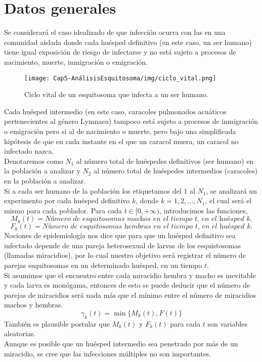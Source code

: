 \section{Datos generales}
    \label{datos-generales} 
    Se considerará el caso idealizado de que infección ocurra con las en una comunidad aislada donde cada huésped definitivo (en este caso, un ser humano) tiene igual exposición de riesgo de infectarse y no está sujeto a procesos de nacimiento, muerte, inmigración o emigración.\\
    \begin{figure}
        \centering
         \texttt{[image: Cap5-AnálisisEsquitosoma/img/ciclo\_vital.png]}
        \caption{Ciclo vital de un esquitosoma que infecta a un ser humano.}
    \end{figure}
    Cada huésped intermedio (en este caso, caracoles pulmonados acuáticos pertenecientes al género Lymnaea) tampoco está sujeto a procesos de inmigración o emigración pero sí al de nacimiento o muerte, pero bajo una simplificada hipótesis de que en cada instante en el que un caracol muera, un caracol no infectado nazca.\\
    Denotaremos como $N_1$ al número total de huéspedes definitivos (ser humano) en la población a analizar y $N_2$ al número total de huéspedes intermedios (caracoles) en la población a analizar.\\
    Si a cada ser humano de la población los etiquetamos del $1$ al $N_1$, se analizará un experimento por cada huésped definitivo $k$, donde $k=1,2,\ldots,N_1$, el cual será el mismo para cada poblador.
    Para cada $t\in[0,+\infty)$, introducimos las funciones,
    $$M_k(t)= \textit{Número de esquitosomas machos en el tiempo t, en el huésped k.}$$
    $$F_k(t)=\textit{Número de esquitosomas hembras en el tiempo t, en el huésped k.}$$
    Nociones de epidemiología nos dice que para que un huésped definitivo sea infectado depende de una pareja heterosexual de larvas de los esquistosomas (llamadas miracidios), por lo cual nuestro objetivo será registrar el número de parejas esquitosomas en un determinado huésped, en un tiempo $t$.\\Si asumimos que el encuentro entre cada miracidio hembra y macho es inevitable y cada larva es monógama, entonces de esto se puede deducir que el número de parejas de miracidios será nada más que el mínimo entre el número de miracidios machos y hembras.
    $$\gamma_k(t)=\min\{M_k(t),F(t)\}$$
    También es plausible postular que $M_k(t)$ y $F_k(t)$ para cada $t$ son variables aleatorias.\\
    Aunque es posible que un huésped intermedio sea penetrado por más de un miracidio, se cree que las infecciones múltiples no son importantes.
    
